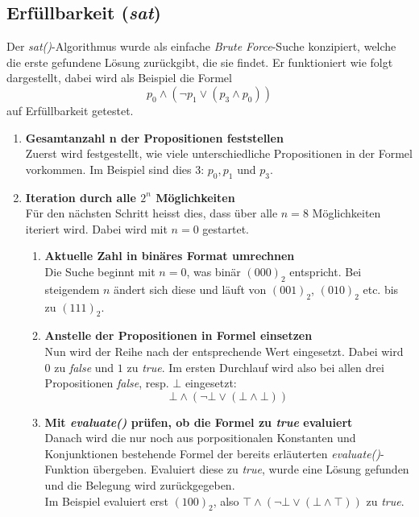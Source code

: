 \documentclass[11pt,a4paper,ngerman]{scrreprt}
\begin{document}
\subsection{Erfüllbarkeit (\textit{sat})}
Der \textit{sat()}-Algorithmus wurde als einfache \textit{Brute Force}-Suche konzipiert, welche die erste gefundene Lösung zurückgibt, die sie findet. Er funktioniert wie folgt dargestellt, dabei wird als Beispiel die Formel 
\begin{equation}
p_0 \wedge ( \neg p_1 \vee ( p_3 \wedge p_0 ) )
\end{equation}
auf Erfüllbarkeit getestet.
\begin{enumerate}
 \item \textbf{Gesamtanzahl n der Propositionen feststellen} \\
 Zuerst wird festgestellt, wie viele unterschiedliche Propositionen in der Formel vorkommen. Im Beispiel sind dies 3: $p_0, p_1$ und $p_3$.
 \item \textbf{Iteration durch alle $2^n$ Möglichkeiten} \\
 Für den nächsten Schritt heisst dies, dass über alle $n=8$ Möglichkeiten iteriert wird. Dabei wird mit $n=0$ gestartet.
 \begin{enumerate}
 \item \textbf{Aktuelle Zahl in binäres Format umrechnen} \\
 Die Suche beginnt mit $n=0$, was binär $(000)_2$ entspricht. Bei steigendem $n$ ändert sich diese und läuft von $(001)_2$, $(010)_2$ etc. bis zu $(111)_2$.
 \item \textbf{Anstelle der Propositionen in Formel einsetzen} \\
 Nun wird der Reihe nach der entsprechende Wert eingesetzt. Dabei wird $0$ zu \textit{false} und $1$ zu \textit{true}. Im ersten Durchlauf wird also bei allen drei Propositionen \textit{false}, resp. $\bot$ eingesetzt:
 \begin{equation}
 \bot \wedge ( \neg \bot \vee ( \bot \wedge \bot ) )
 \end{equation}
 \item \textbf{Mit \textit{evaluate()} prüfen, ob die Formel zu \textit{true} evaluiert} \\
 Danach wird die nur noch aus porpositionalen Konstanten und Konjunktionen bestehende Formel der bereits erläuterten \textit{evaluate()}-Funktion übergeben. Evaluiert diese zu \textit{true}, wurde eine Lösung gefunden und die Belegung wird zurückgegeben. \\
 Im Beispiel evaluiert erst $(100)_2$, also $\top \wedge ( \neg \bot \vee ( \bot \wedge \top ) )$ zu \textit{true}.
 
 \end{enumerate}
\end{enumerate}
\end{document}
